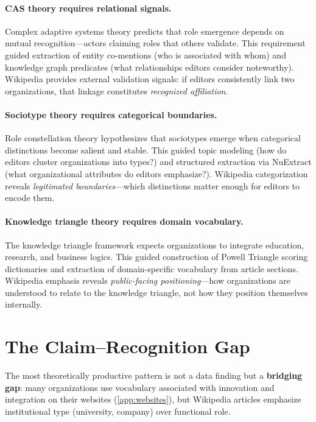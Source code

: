 \documentclass[../main.tex]{subfiles}
\begin{document}
\paragraph{CAS theory requires relational signals.}
Complex adaptive systems theory predicts that role emergence depends on
mutual recognition---actors claiming roles that others validate.
This requirement guided extraction of entity co-mentions (who is
associated with whom) and knowledge graph predicates (what relationships
editors consider noteworthy).
Wikipedia provides external validation signals: if editors consistently
link two organizations, that linkage constitutes \emph{recognized affiliation}.

\paragraph{Sociotype theory requires categorical boundaries.}
Role constellation theory hypothesizes that sociotypes emerge when
categorical distinctions become salient and stable.
This guided topic modeling (how do editors cluster organizations into types?)
and structured extraction via NuExtract (what organizational attributes
do editors emphasize?).
Wikipedia categorization reveals \emph{legitimated boundaries}---which
distinctions matter enough for editors to encode them.

\paragraph{Knowledge triangle theory requires domain vocabulary.}
The knowledge triangle framework expects organizations to integrate
education, research, and business logics.
This guided construction of Powell Triangle scoring dictionaries and
extraction of domain-specific vocabulary from article sections.
Wikipedia emphasis reveals \emph{public-facing positioning}---how
organizations are understood to relate to the knowledge triangle,
not how they position themselves internally.


\section{The Claim--Recognition Gap}
\label{sec:wikipedia-gap}

The most theoretically productive pattern is not a data finding
but a \textbf{bridging gap}: many organizations use vocabulary
associated with innovation and integration on their websites
(\cref{app:websites}), but Wikipedia articles emphasize
institutional type (university, company) over functional role.
\end{document}
